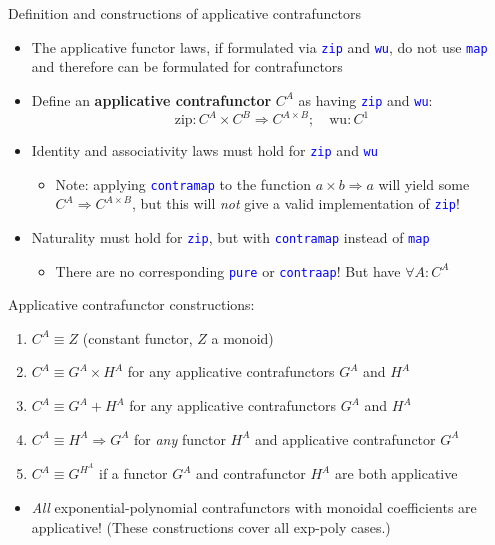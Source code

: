 \documentclass[english]{beamer}
\begin{document}
\begin{frame}{Definition and constructions of applicative contrafunctors}
\begin{itemize}
\item \vspace{-0.2cm}The applicative functor laws, if formulated via \texttt{\textcolor{blue}{\footnotesize{}zip}}
and \texttt{\textcolor{blue}{\footnotesize{}wu}}, do not use \texttt{\textcolor{blue}{\footnotesize{}map}}
and therefore can be formulated for contrafunctors
\item Define an \textbf{applicative contrafunctor} $C^{A}$ as having \texttt{\textcolor{blue}{\footnotesize{}zip}}
and \texttt{\textcolor{blue}{\footnotesize{}wu}}:{\footnotesize{}
\[
\text{zip}:C^{A}\times C^{B}\Rightarrow C^{A\times B};\quad\text{wu}:C^{1}
\]
}{\footnotesize \par}
\item Identity and associativity laws must hold for \texttt{\textcolor{blue}{\footnotesize{}zip}}
and \texttt{\textcolor{blue}{\footnotesize{}wu}} 
\begin{itemize}
\item Note: applying \texttt{\textcolor{blue}{\footnotesize{}contramap}}
to the function $a\times b\Rightarrow a$ will yield some $C^{A}\Rightarrow C^{A\times B}$,
but this will \emph{not} give a valid implementation of \texttt{\textcolor{blue}{\footnotesize{}zip}}!
\end{itemize}
\item Naturality must hold for \texttt{\textcolor{blue}{\footnotesize{}zip}},
but with \texttt{\textcolor{blue}{\footnotesize{}contramap}} instead
of \texttt{\textcolor{blue}{\footnotesize{}map}} 
\begin{itemize}
\item There are no corresponding \texttt{\textcolor{blue}{\footnotesize{}pure}}
or \texttt{\textcolor{blue}{\footnotesize{}contraap}}! But have $\forall A:C^{A}$
\end{itemize}
\end{itemize}
Applicative contrafunctor constructions:
\begin{enumerate}
\item $C^{A}\equiv Z$ (constant functor, $Z$ a monoid)
\item $C^{A}\equiv G^{A}\times H^{A}$ for any applicative contrafunctors
$G^{A}$ and $H^{A}$
\item $C^{A}\equiv G^{A}+H^{A}$ for any applicative contrafunctors $G^{A}$
and $H^{A}$
\item $C^{A}\equiv H^{A}\Rightarrow G^{A}$ for \emph{any} functor $H^{A}$
and applicative contrafunctor $G^{A}$
\item $C^{A}\equiv G^{H^{A}}$ if a functor $G^{A}$ and contrafunctor $H^{A}$
are both applicative
\end{enumerate}
\begin{itemize}
\item \emph{All} exponential-polynomial contrafunctors with monoidal coefficients
are applicative! (These constructions cover all exp-poly cases.)
\end{itemize}
\end{frame}
\end{document}
